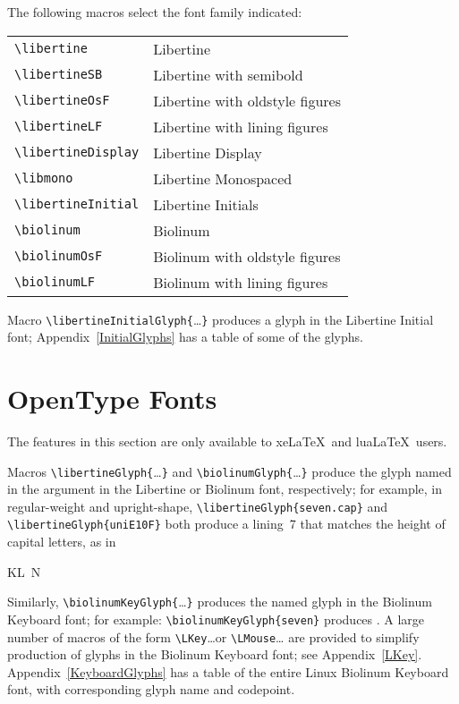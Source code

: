 \documentclass[11pt]{article}
\begin{document}
The following macros select the font family indicated:
\begin{center}
\begin{tabular}{ll}
\verb|\libertine| & Libertine \\
\verb|\libertineSB|& Libertine with semibold \\
\verb|\libertineOsF| & Libertine with oldstyle figures \\
\verb|\libertineLF| & Libertine with lining figures \\
\verb|\libertineDisplay| & Libertine Display \\
\verb|\libmono| & Libertine Monospaced \\
\verb|\libertineInitial| & Libertine Initials \\
\verb|\biolinum| & Biolinum \\
\verb|\biolinumOsF|& Biolinum with oldstyle figures \\
\verb|\biolinumLF| & Biolinum with lining figures \\
\end{tabular}
\end{center}
Macro \verb|\libertineInitialGlyph{|\ldots\verb|}| produces a glyph in the Libertine Initial font;
Appendix~\ref{InitialGlyphs} has a table of some of the glyphs.

\section{OpenType Fonts}
\label{OpenType}

The features in this section are only available to xe\LaTeX\ and lua\LaTeX\ users.

Macros \verb|\libertineGlyph{|\ldots\verb|}| and \verb|\biolinumGlyph{|\ldots\verb|}| produce the
glyph named in the argument in the Libertine or Biolinum font,
respectively; for example, in regular-weight and upright-shape,
\verb|\libertineGlyph{seven.cap}| and \verb|\libertineGlyph{uniE10F}| both produce a
lining~7 that matches the height of capital letters, as in
\begin{list}{}{}\item
KL~N
\end{list}
Similarly, \verb|\biolinumKeyGlyph{|\ldots\verb|}| produces the named glyph
in the Biolinum Keyboard font; for example: \verb|\biolinumKeyGlyph{seven}| produces .
A large number of macros of the form \verb|\LKey|\ldots or \verb|\LMouse|\ldots
are provided to simplify production of glyphs in the Biolinum Keyboard font;
see Appendix~\ref{LKey}. Appendix~\ref{KeyboardGlyphs} has a table of the entire
Linux Biolinum Keyboard font, with corresponding glyph name and codepoint.
\end{document}
